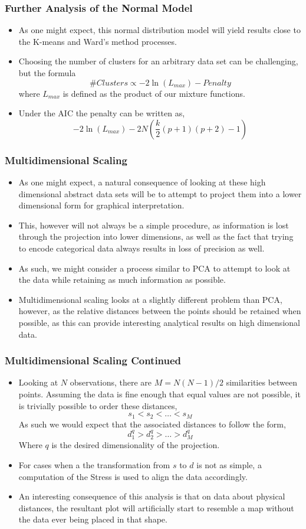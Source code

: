 \documentclass{beamer}
\begin{document}
\begin{frame}
\frametitle{Further Analysis of the Normal Model}
\begin{itemize}
\item As one might expect, this normal distribution model will yield results close to the K-means and Ward's method processes.
\item Choosing the number of clusters for an arbitrary data set can be challenging, but the formula
\[\#Clusters \propto -2\ln(L_{max})-Penalty\]
where $L_{max}$ is defined as the product of our mixture functions.
\item Under the AIC the penalty can be written as,
\[-2\ln(L_{max})-2N(\frac{k}{2}(p+1)(p+2)-1)\]
\end{itemize}
\end{frame}

\begin{frame}
\frametitle{Multidimensional Scaling}
\begin{itemize}
\item As one might expect, a natural consequence of looking at these high dimensional abstract data sets will be to attempt to project them into a lower dimensional form for graphical interpretation.
\item This, however will not always be a simple procedure, as information is lost through the projection into lower dimensions, as well as the fact that trying to encode categorical data always results in loss of precision as well.
\item As such, we might consider a process similar to PCA to attempt to look at the data while retaining as much information as possible.
\item Multidimensional scaling looks at a slightly different problem than PCA, however, as the relative distances between the points should be retained when possible, as this can provide interesting analytical results on high dimensional data.
\end{itemize}
\end{frame}

\begin{frame}
\frametitle{Multidimensional Scaling Continued}
\begin{itemize}
\item Looking at $N$ observations, there are $M=N(N-1)/2$ similarities between points. Assuming the data is fine enough that equal values are not possible, it is trivially possible to order these distances,
\[s_{1} < s_{2} <\ldots < s_{M}\]
As such we would expect that the associated distances to follow the form,
\[d_1^q > d_2^q > \ldots > d_M^q\]
Where $q$ is the desired dimensionality of the projection.
\item For cases when a the transformation from $s$ to $d$ is not as simple, a computation of the Stress is used to align the data accordingly.
\item An interesting consequence of this analysis is that on data about physical distances, the resultant plot will artificially start to resemble a map without the data ever being placed in that shape.
\end{itemize}
\end{frame}
\end{document}
